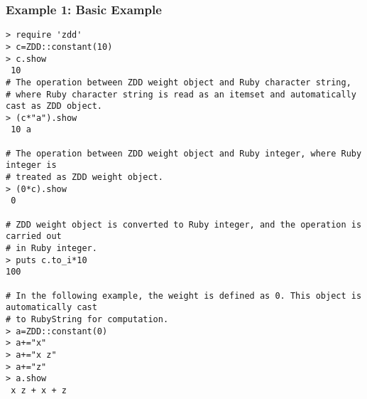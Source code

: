 \subsubsection*{Example 1: Basic Example}



\begin{Verbatim}[baselinestretch=0.7,frame=single]
> require 'zdd'
> c=ZDD::constant(10)
> c.show
 10
# The operation between ZDD weight object and Ruby character string,
# where Ruby character string is read as an itemset and automatically cast as ZDD object.
> (c*"a").show
 10 a

# The operation between ZDD weight object and Ruby integer, where Ruby integer is
# treated as ZDD weight object.
> (0*c).show
 0

# ZDD weight object is converted to Ruby integer, and the operation is carried out
# in Ruby integer.
> puts c.to_i*10
100

# In the following example, the weight is defined as 0. This object is automatically cast
# to RubyString for computation.
> a=ZDD::constant(0)
> a+="x"
> a+="x z"
> a+="z"
> a.show
 x z + x + z
\end{Verbatim}
